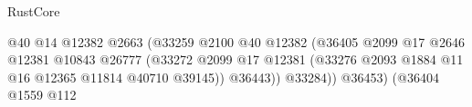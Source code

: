 \begin{lexlean}{RustCore}
\begin{coremodule}
                                                                    @40
                                                                    @14
                                                                    @12382
                                                                    @2663
                                                                    (@33259
                                                                      @2100
                                                                      @40
                                                                      @12382
                                                                      (@36405
                                                                        @2099
                                                                        @17
                                                                        @2646
                                                                        @12381
                                                                        @10843
                                                                        @26777
                                                                        (@33272
                                                                          @2099
                                                                          @17
                                                                          @12381
                                                                          (@33276
                                                                            @2093
                                                                            @1884
                                                                            @11
                                                                            @16
                                                                            @12365
                                                                            @11814
                                                                            @40710
                                                                            @39145))
                                                                        @36443))
                                                                    @33284))
                                                                @36453)
                                                              (@36404
                                                                @1559
                                                                @112

\end{coremodule}
\end{lexlean}
